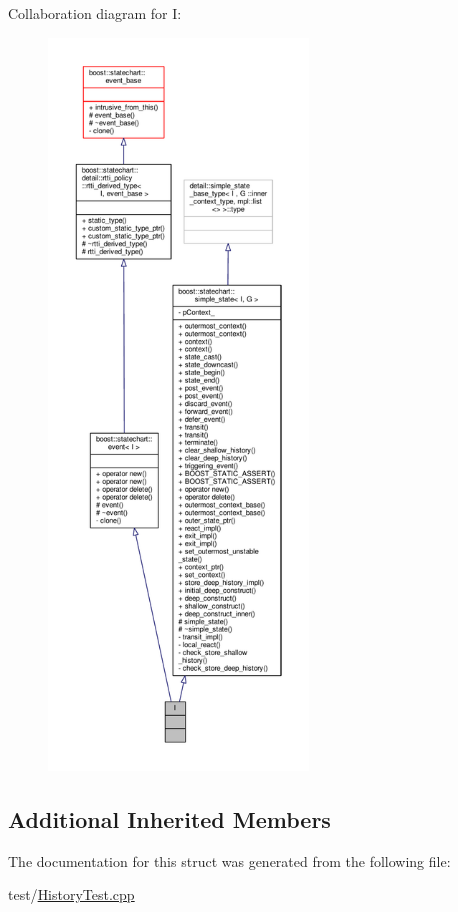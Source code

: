 Collaboration diagram for I\+:
\nopagebreak
\begin{figure}[H]
\begin{center}
\leavevmode
\includegraphics[height=550pt]{struct_i__coll__graph}
\end{center}
\end{figure}
\subsection*{Additional Inherited Members}


The documentation for this struct was generated from the following file\+:\begin{DoxyCompactItemize}
\item 
test/\mbox{\hyperlink{_history_test_8cpp}{History\+Test.\+cpp}}\end{DoxyCompactItemize}
